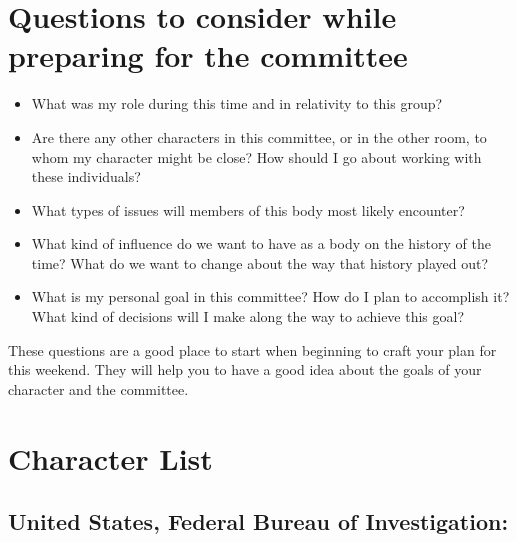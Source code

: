 \documentclass[10pt, letterpaper]{article}
\begin{document}
\newpage
\section{Questions to consider while preparing for the
committee}

\begin{itemize}
\item What was my role during this time and in relativity to this group?

\item Are there any other characters in this committee, or in the other
room, to whom my character might be close? How should I go about working
with these individuals?

\item What types of issues will members of this body most likely encounter?

\item What kind of influence do we want to have as a body on the history of
the time? What do we want to change about the way that history played
out?

\item What is my personal goal in this committee? How do I plan to
accomplish it? What kind of decisions will I make along the way to
achieve this goal?
\end{itemize}

These questions are a good place to start when beginning to craft your
plan for this weekend. They will help you to have a good idea about the
goals of your character and the committee. \\

\newpage
\section{Character List}

\subsection{United States, Federal Bureau of Investigation:}
\end{document}
